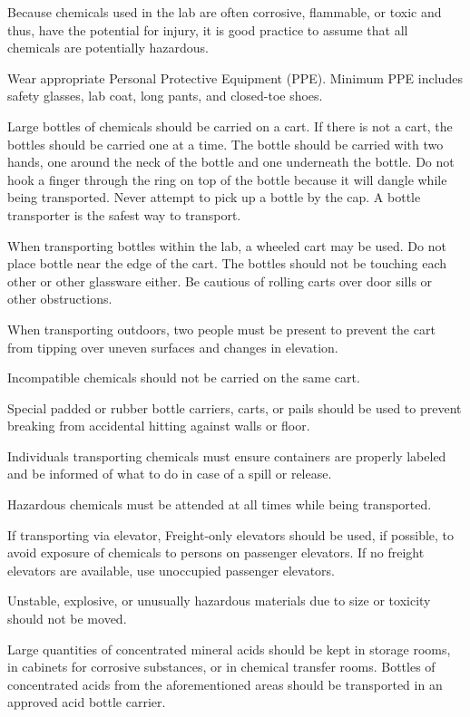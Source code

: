 \documentclass[12pt]{../SOP4_alpha}\usepackage[]{graphicx}\usepackage[]{color}
\begin{document}
\NP Because chemicals used in the lab are often corrosive, flammable, or toxic and thus, have the potential for injury, it is good practice to assume that all chemicals are potentially hazardous. 

\NP Wear appropriate Personal Protective Equipment (PPE). Minimum PPE includes safety glasses, lab coat, long pants, and closed-toe shoes.

\NP Large bottles of chemicals should be carried on a cart. If there is not a cart, the bottles should be carried one at a time. The bottle should be carried with two hands, one around the neck of the bottle and one underneath the bottle. Do not hook a finger through the ring on top of the bottle because it will dangle while being transported. Never attempt to pick up a bottle by the cap. A bottle transporter is the safest way to transport. 

\NP When transporting bottles within the lab, a wheeled cart may be used. Do not place bottle near the edge of the cart. The bottles should not be touching each other or other glassware either. Be cautious of rolling carts over door sills or other obstructions.

\NP When transporting outdoors, two people must be present to prevent the cart from tipping over uneven surfaces and changes in elevation.

\NP Incompatible chemicals should not be carried on the same cart. 

\NP Special padded or rubber bottle carriers, carts, or pails should be used to prevent breaking from accidental hitting against walls or floor. 

\NP Individuals transporting chemicals must ensure containers are properly labeled and be informed of what to do in case of a spill or release. 

\NP Hazardous chemicals must be attended at all times while being transported.

\NP If transporting via elevator, Freight-only elevators should be used, if possible, to avoid exposure of chemicals to persons on passenger elevators. If no freight elevators are available, use unoccupied passenger elevators.  

\NP Unstable, explosive, or unusually hazardous materials due to size or toxicity should not be moved. 

\NP Large quantities of concentrated mineral acids should be kept in storage rooms, in cabinets for corrosive substances, or in chemical transfer rooms. Bottles of concentrated acids from the aforementioned areas should be transported in an approved acid bottle carrier. 
\end{document}
